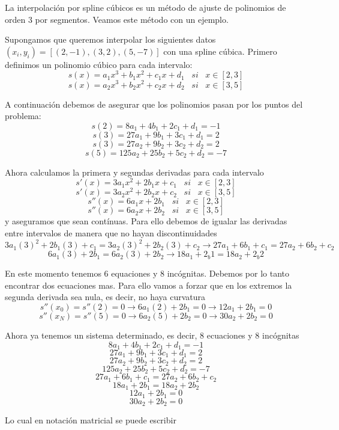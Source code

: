 \documentclass[
]{agujournal2019}
\begin{document}
La interpolación por spline cúbicos es un método de ajuste de polinomios
de orden 3 por segmentos. Veamos este método con un ejemplo.

Supongamos que queremos interpolar los siguientes datos
\((x_i,y_i)=[(2,-1), (3,2), (5,-7)]\) con una spline cúbica. Primero
definimos un polinomio cúbico para cada intervalo:
\[s(x)=a_1x^3 + b_1 x^2 +c_1x +d_1\,\,\,\,\,{ si}\,\,\,\,\,x\in[2,3]\]
\[s(x)=a_2x^3 + b_2 x^2 +c_2x +d_2\,\,\,\,\,{ si}\,\,\,\,\,x\in[3,5]\]

A continuación debemos de asegurar que los polinomios pasan por los
puntos del problema: \[s(2)=8a_1 + 4b_1  +2c_1 +d_1=-1\]
\[s(3)=27a_1 + 9b_1  +3c_1 +d_1=2\] \[s(3)=27a_2 + 9b_2  +3c_2 +d_2=2\]
\[s(5)=125a_2 + 25b_2  +5c_2 +d_2=-7\]

Ahora calculamos la primera y segundas derivadas para cada intervalo
\[s'(x)=3a_1x^2+2b_1x+c_1\,\,\,\,\,{ si}\,\,\,\,\,x\in[2,3]\]
\[s'(x)=3a_2x^2+2b_2x+c_2\,\,\,\,\,{ si}\,\,\,\,\,x\in[3,5]\]
\[s''(x)=6a_1x+2b_1\,\,\,\,\,{ si}\,\,\,\,\,x\in[2,3]\]
\[s''(x)=6a_2x+2b_2\,\,\,\,\,{ si}\,\,\,\,\,x\in[3,5]\] y aseguramos que
sean contínuas. Para ello debemos de igualar las derivadas entre
intervalos de manera que no hayan discontinuidades
\[3a_1(3)^2+2b_1(3)+c_1=3a_2(3)^2+2b_2(3)+c_2\rightarrow 27a_1+6b_1+c_1=27a_2+6b_2+c_2\]
\[6a_1(3)+2b_1=6a_2(3)+2b_2\rightarrow 18a_1+2_b1=18a_2+2_b2\]

En este momento tenemos 6 equaciones y 8 incógnitas. Debemos por lo
tanto encontrar dos ecuaciones mas. Para ello vamos a forzar que en los
extremos la segunda derivada sea nula, es decir, no haya curvatura
\[s''(x_0)=s''(2)=0\rightarrow 6a_1(2)+2b_1=0 \rightarrow 12a_1 + 2b_1=0\]
\[s''(x_N)=s''(5)=0\rightarrow 6a_2(5)+2b_2=0 \rightarrow 30a_2+2b_2=0\]

Ahora ya tenemos un sistema determinado, es decir, 8 ecuaciones y 8
incógnitas \[8a_1 + 4b_1  +2c_1 +d_1=-1\] \[27a_1 + 9b_1  +3c_1 +d_1=2\]
\[27a_2 + 9b_2  +3c_2 +d_2=2\] \[125a_2 + 25b_2  +5c_2 +d_2=-7\]
\[27a_1+6b_1+c_1=27a_2+6b_2+c_2\] \[18a_1+2b_1=18a_2+2b_2\]
\[12a_1 + 2b_1=0\] \[30a_2+2b_2=0\]

Lo cual en notación matricial se puede escribir
\end{document}
